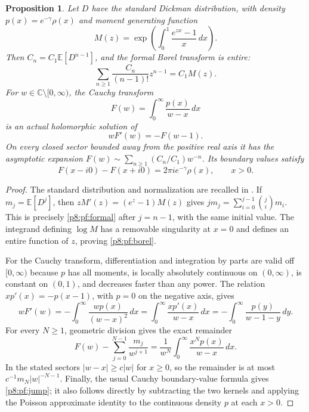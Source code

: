 \documentclass[11pt,a4paper]{article}
\newtheorem{proposition}[theorem]{Proposition}
\theoremstyle{definition}
\theoremstyle{remark}
\numberwithin{equation}{section}
\begin{document}
\begin{proposition}\label{p8:pf:moments}
Let $D$ have the standard Dickman distribution, with density
$p(x)=e^{-\gamma}\rho(x)$ and moment generating function
\[
 M(z)=\exp\left(\int_0^1\frac{e^{zx}-1}{x}\,dx\right).
\]
Then $C_n=C_1\mathbb E[D^{n-1}]$, and the formal Borel transform is entire:
\begin{equation}\label{p8:pf:borel}
 \sum_{n\geq1}\frac{C_n}{(n-1)!}z^{n-1}=C_1M(z).
\end{equation}
For $w\in\mathbb C\setminus[0,\infty)$, the Cauchy transform
\[
 F(w)=\int_0^\infty\frac{p(x)}{w-x}\,dx
\]
is an actual holomorphic solution of
\begin{equation}\label{p8:pf:cauchy-dde}
 w F'(w)=-F(w-1).
\end{equation}
On every closed sector bounded away from the positive real axis it has
the asymptotic expansion $F(w)\sim\sum_{n\geq1}(C_n/C_1)w^{-n}$.
Its boundary values satisfy
\begin{equation}\label{p8:pf:jump}
 F(x-i0)-F(x+i0)=2\pi i e^{-\gamma}\rho(x),\qquad x>0.
\end{equation}
\end{proposition}
\begin{proof}
The standard distribution and normalization are recalled in
\cite[Section~1]{p8:PinskyDickman2016}. If $m_j=\mathbb E[D^j]$, then
$zM'(z)=(e^z-1)M(z)$ gives
$j m_j=\sum_{i=0}^{j-1}\binom ji m_i$. This is precisely
\eqref{p8:pf:formal} after $j=n-1$, with the same initial value. The
integrand defining $\log M$ has a removable singularity at $x=0$ and
defines an entire function of $z$, proving \eqref{p8:pf:borel}.

For the Cauchy transform, differentiation and integration by parts are
valid off $[0,\infty)$ because $p$ has all moments, is locally absolutely
continuous on $(0,\infty)$, is constant on $(0,1)$, and decreases faster
than any power. The relation $xp'(x)=-p(x-1)$, with $p=0$ on the negative
axis, gives
\[
 wF'(w)=-\int_0^\infty\frac{wp(x)}{(w-x)^2}\,dx
       =\int_0^\infty\frac{xp'(x)}{w-x}\,dx
       =-\int_0^\infty\frac{p(y)}{w-1-y}\,dy.
\]
For every $N\geq1$, geometric division gives the exact remainder
\[
 F(w)-\sum_{j=0}^{N-1}\frac{m_j}{w^{j+1}}
   =\frac1{w^N}\int_0^\infty\frac{x^Np(x)}{w-x}\,dx.
\]
In the stated sectors $|w-x|\geq c|w|$ for $x\geq0$, so the remainder
is at most $c^{-1}m_N|w|^{-N-1}$. Finally, the usual Cauchy boundary-value
formula gives \eqref{p8:pf:jump}; it also follows directly by subtracting
the two kernels and applying the Poisson approximate identity to the
continuous density $p$ at each $x>0$.
\end{proof}
\end{document}
